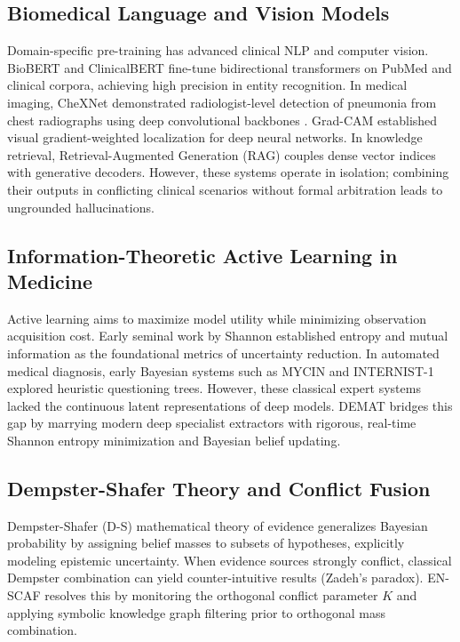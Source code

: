\documentclass[10pt,twocolumn]{article}
\begin{document}
\subsection{Biomedical Language and Vision Models}
Domain-specific pre-training has advanced clinical NLP and computer vision. BioBERT \cite{lee2020biobert} and ClinicalBERT fine-tune bidirectional transformers on PubMed and clinical corpora, achieving high precision in entity recognition. In medical imaging, CheXNet \cite{rajpurkar2017chexnet} demonstrated radiologist-level detection of pneumonia from chest radiographs using deep convolutional backbones \cite{he2016deep}. Grad-CAM \cite{selvaraju2017grad} established visual gradient-weighted localization for deep neural networks. In knowledge retrieval, Retrieval-Augmented Generation (RAG) \cite{lewis2020retrieval} couples dense vector indices \cite{johnson2019billion} with generative decoders. However, these systems operate in isolation; combining their outputs in conflicting clinical scenarios without formal arbitration leads to ungrounded hallucinations.

\subsection{Information-Theoretic Active Learning in Medicine}
Active learning aims to maximize model utility while minimizing observation acquisition cost. Early seminal work by Shannon \cite{shannon1948mathematical} established entropy and mutual information as the foundational metrics of uncertainty reduction. In automated medical diagnosis, early Bayesian systems such as MYCIN and INTERNIST-1 explored heuristic questioning trees. However, these classical expert systems lacked the continuous latent representations of deep models. DEMAT bridges this gap by marrying modern deep specialist extractors with rigorous, real-time Shannon entropy minimization and Bayesian belief updating.

\subsection{Dempster-Shafer Theory and Conflict Fusion}
Dempster-Shafer (D-S) mathematical theory of evidence \cite{dempster1967upper, shafer1976mathematical} generalizes Bayesian probability by assigning belief masses to subsets of hypotheses, explicitly modeling epistemic uncertainty. When evidence sources strongly conflict, classical Dempster combination can yield counter-intuitive results (Zadeh's paradox). EN-SCAF resolves this by monitoring the orthogonal conflict parameter $K$ and applying symbolic knowledge graph filtering prior to orthogonal mass combination.
\end{document}
